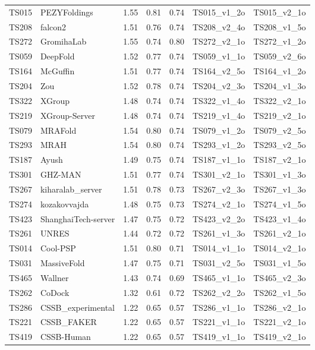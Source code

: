 \begin{longtable}{lllllll}
TS015 & PEZYFoldings & 1.55 & 0.81 & 0.74 & TS015\_v1\_2o & TS015\_v2\_1o \\ 
TS208 & falcon2 & 1.51 & 0.76 & 0.74 & TS208\_v2\_4o & TS208\_v1\_5o \\ 
TS272 & GromihaLab & 1.55 & 0.74 & 0.80 & TS272\_v2\_1o & TS272\_v1\_2o \\ 
TS059 & DeepFold & 1.52 & 0.77 & 0.74 & TS059\_v1\_1o & TS059\_v2\_6o \\ 
TS164 & McGuffin & 1.51 & 0.77 & 0.74 & TS164\_v2\_5o & TS164\_v1\_2o \\ 
TS204 & Zou & 1.52 & 0.78 & 0.74 & TS204\_v2\_3o & TS204\_v1\_3o \\ 
TS322 & XGroup & 1.48 & 0.74 & 0.74 & TS322\_v1\_4o & TS322\_v2\_1o \\ 
TS219 & XGroup-Server & 1.48 & 0.74 & 0.74 & TS219\_v1\_4o & TS219\_v2\_1o \\ 
TS079 & MRAFold & 1.54 & 0.80 & 0.74 & TS079\_v1\_2o & TS079\_v2\_5o \\ 
TS293 & MRAH & 1.54 & 0.80 & 0.74 & TS293\_v1\_2o & TS293\_v2\_5o \\ 
TS187 & Ayush & 1.49 & 0.75 & 0.74 & TS187\_v1\_1o & TS187\_v2\_1o \\ 
TS301 & GHZ-MAN & 1.51 & 0.77 & 0.74 & TS301\_v2\_1o & TS301\_v1\_3o \\ 
TS267 & kiharalab\_server & 1.51 & 0.78 & 0.73 & TS267\_v2\_3o & TS267\_v1\_3o \\ 
TS274 & kozakovvajda & 1.48 & 0.75 & 0.73 & TS274\_v2\_1o & TS274\_v1\_5o \\ 
TS423 & ShanghaiTech-server & 1.47 & 0.75 & 0.72 & TS423\_v2\_2o & TS423\_v1\_4o \\ 
TS261 & UNRES & 1.44 & 0.72 & 0.72 & TS261\_v1\_3o & TS261\_v2\_1o \\ 
TS014 & Cool-PSP & 1.51 & 0.80 & 0.71 & TS014\_v1\_1o & TS014\_v2\_1o \\ 
TS031 & MassiveFold & 1.47 & 0.75 & 0.71 & TS031\_v2\_5o & TS031\_v1\_5o \\ 
TS465 & Wallner & 1.43 & 0.74 & 0.69 & TS465\_v1\_1o & TS465\_v2\_3o \\ 
TS262 & CoDock & 1.32 & 0.61 & 0.72 & TS262\_v2\_2o & TS262\_v1\_5o \\ 
TS286 & CSSB\_experimental & 1.22 & 0.65 & 0.57 & TS286\_v1\_1o & TS286\_v2\_1o \\ 
TS221 & CSSB\_FAKER & 1.22 & 0.65 & 0.57 & TS221\_v1\_1o & TS221\_v2\_1o \\ 
TS419 & CSSB-Human & 1.22 & 0.65 & 0.57 & TS419\_v1\_1o & TS419\_v2\_1o \\ 

\end{longtable}
